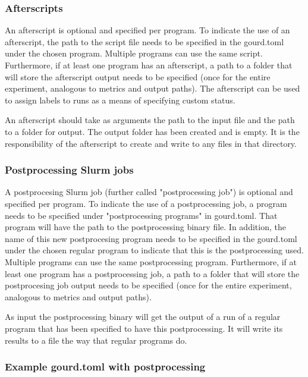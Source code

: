 \subsubsection{Afterscripts}
An afterscript is optional and specified per program. To indicate the use of an afterscript, the path to the script
file needs to be specified in the gourd.toml under the chosen program. Multiple programs can use the same script.
Furthermore, if at least one program has an afterscript, a path to a folder that will store the afterscript output
needs to be specified (once for the entire experiment, analogous to metrics and output paths). The afterscript can
be used to assign labels to runs as a means of specifying custom status.

An afterscript should take as arguments the path to the input file and the path to a folder for output. The output
folder has been created and is empty. It is the responsibility of the afterscript to create and write to any files
in that directory.

\subsubsection{Postprocessing Slurm jobs}
A postprocesing Slurm job (further called "postprocessing job") is optional and specified per program. To indicate
the use of a postprocessing job, a program needs to be specified under "postprocessing programs" in gourd.toml.
That program will have the path to the postprocessing binary file. In addition, the name of this new postprocesing
program needs to be specified in the gourd.toml under the chosen regular program to indicate that this is the
postprocessing used. Multiple programs can use the same postprocessing program. Furthermore, if at least one program
has a postprocessing job, a path to a folder that will store the postprocesing job output needs to be specified
(once for the entire experiment, analogous to metrics and output paths).

As input the postprocessing binary will get the output of a run of a regular program that has been specified to have
this postprocessing. It will write its results to a file the way that regular programs do.

\subsubsection{Example gourd.toml with postprocessing}

